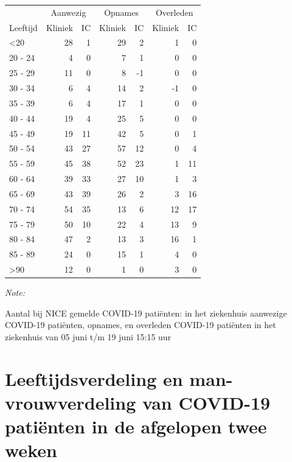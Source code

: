 \documentclass[
  english,
  man,floatsintext]{apa6}
\begin{document}
\begin{table}
\centering\begingroup\fontsize{10}{12}\selectfont

\begin{threeparttable}
\begin{tabular}{lrrrrrr}
\toprule
\multicolumn{1}{c}{ } & \multicolumn{2}{c}{Aanwezig} & \multicolumn{2}{c}{Opnames} & \multicolumn{2}{c}{Overleden} \\
\cmidrule(l{3pt}r{3pt}){2-3} \cmidrule(l{3pt}r{3pt}){4-5} \cmidrule(l{3pt}r{3pt}){6-7}
Leeftijd & Kliniek & IC & Kliniek & IC & Kliniek & IC\\
\midrule
<20 & 28 & 1 & 29 & 2 & 1 & 0\\
20 - 24 & 4 & 0 & 7 & 1 & 0 & 0\\
25 - 29 & 11 & 0 & 8 & -1 & 0 & 0\\
30 - 34 & 6 & 4 & 14 & 2 & -1 & 0\\
35 - 39 & 6 & 4 & 17 & 1 & 0 & 0\\
40 - 44 & 19 & 4 & 25 & 5 & 0 & 0\\
45 - 49 & 19 & 11 & 42 & 5 & 0 & 1\\
50 - 54 & 43 & 27 & 57 & 12 & 0 & 4\\
55 - 59 & 45 & 38 & 52 & 23 & 1 & 11\\
60 - 64 & 39 & 33 & 27 & 10 & 1 & 3\\
65 - 69 & 43 & 39 & 26 & 2 & 3 & 16\\
70 - 74 & 54 & 35 & 13 & 6 & 12 & 17\\
75 - 79 & 50 & 10 & 22 & 4 & 13 & 9\\
80 - 84 & 47 & 2 & 13 & 3 & 16 & 1\\
85 - 89 & 24 & 0 & 15 & 1 & 4 & 0\\
>90 & 12 & 0 & 1 & 0 & 3 & 0\\
\bottomrule
\end{tabular}
\begin{tablenotes}
\item \textit{Note: } 
\item Aantal bij NICE gemelde COVID-19 patiënten: in het ziekenhuis aanwezige COVID-19 patiënten, opnames, en overleden COVID-19 patiënten in het ziekenhuis van 05 juni t/m 19 juni 15:15 uur
\end{tablenotes}
\end{threeparttable}
\endgroup{}
\end{table}

\newpage

\hypertarget{leeftijdsverdeling-en-man-vrouwverdeling-van-covid-19-patiuxebnten-in-de-afgelopen-twee-weken}{%
\section{Leeftijdsverdeling en man-vrouwverdeling van COVID-19 patiënten in de afgelopen twee weken}\label{leeftijdsverdeling-en-man-vrouwverdeling-van-covid-19-patiuxebnten-in-de-afgelopen-twee-weken}}
\end{document}
